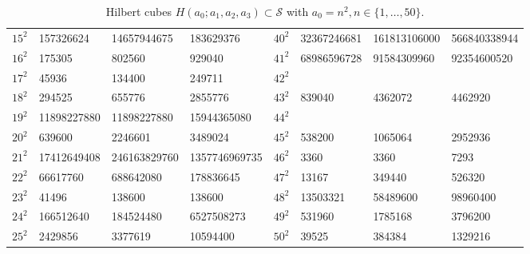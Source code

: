 \documentclass[10pt]{amsart}
\theoremstyle{plain}
\def\cal{\mathcal}
\begin{document}
\begin{landscape}
\begin{table}[htbp]
\begin{tabular}{|l|l|l|l||l|l|l|l|}
$15^2$ & 157326624 & 14657944675 & 183629376 & $40^2$ & 32367246681 & 161813106000 & 566840338944 \\
$16^2$ & 175305 & 802560 & 929040 & $41^2$ & 68986596728 & 91584309960 & 92354600520 \\
$17^2$ & 45936 & 134400 & 249711 & $42^2$ &   &   &   \\
$18^2$ & 294525 & 655776 & 2855776 & $43^2$ & 839040 & 4362072 & 4462920 \\
$19^2$ & 11898227880 & 11898227880 & 15944365080 & $44^2$ &   &   &   \\
$20^2$ & 639600 & 2246601 & 3489024 & $45^2$ & 538200 & 1065064 & 2952936 \\
$21^2$ & 17412649408 & 246163829760 & 1357746969735 & $46^2$ & 3360 & 3360 & 7293 \\
$22^2$ & 66617760 & 688642080 & 178836645 & $47^2$ & 13167 & 349440 & 526320 \\
$23^2$ & 41496 & 138600 & 138600 & $48^2$ & 13503321 & 58489600 & 98960400 \\
$24^2$ & 166512640 & 184524480 & 6527508273 & $49^2$ & 531960 & 1785168 & 3796200 \\
$25^2$ & 2429856 & 3377619 & 10594400 & $50^2$ & 39525 & 384384 & 1329216 \\
\hline
\end{tabular}
\caption{Hilbert cubes $H(a_{0}; a_{1}, a_{2}, a_{3})\subset\cal{S}$ with $a_{0}=n^2, n\in\{1,\ldots, 50\}$.}
\end{table}
\end{landscape}
\end{document}
